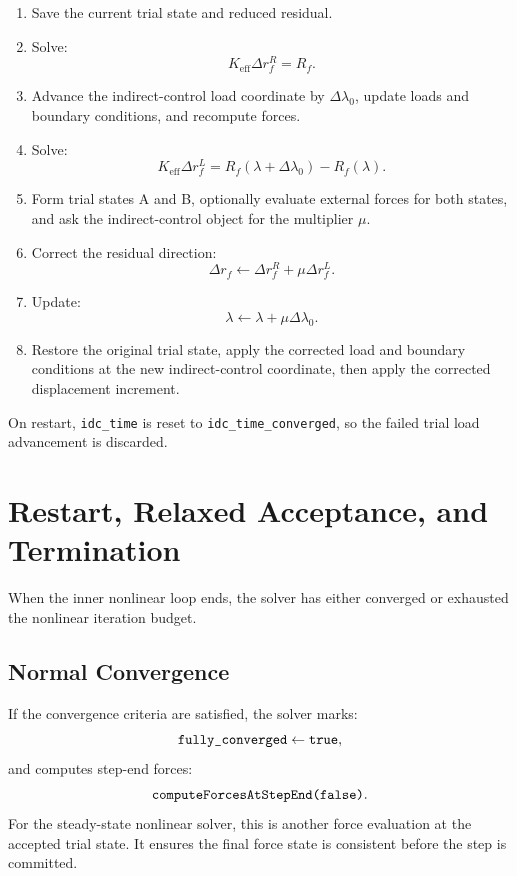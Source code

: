 \documentclass[11pt,a4paper]{article}
\newcommand{\code}[1]{\ifmmode\text{\texttt{\detokenize{#1}}}\else\nolinkurl{#1}\fi}
\begin{document}
\begin{enumerate}[leftmargin=2em]
  \item Save the current trial state and reduced residual.
  \item Solve:
        \[
          K_{\mathrm{eff}} \Delta r_f^R = R_f.
        \]
  \item Advance the indirect-control load coordinate by \(\Delta \lambda_0\),
        update loads and boundary conditions, and recompute forces.
  \item Solve:
        \[
          K_{\mathrm{eff}} \Delta r_f^L
          =
          R_f(\lambda+\Delta\lambda_0) - R_f(\lambda).
        \]
  \item Form trial states A and B, optionally evaluate external forces for
        both states, and ask the indirect-control object for the multiplier
        \(\mu\).
  \item Correct the residual direction:
        \[
          \Delta r_f \leftarrow \Delta r_f^R + \mu \Delta r_f^L.
        \]
  \item Update:
        \[
          \lambda \leftarrow \lambda + \mu \Delta\lambda_0.
        \]
  \item Restore the original trial state, apply the corrected load and boundary
        conditions at the new indirect-control coordinate, then apply the
        corrected displacement increment.
\end{enumerate}

On restart, \code{idc_time} is reset to \code{idc_time_converged}, so the failed
trial load advancement is discarded.

\section{Restart, Relaxed Acceptance, and Termination}

When the inner nonlinear loop ends, the solver has either converged or exhausted
the nonlinear iteration budget.

\subsection{Normal Convergence}

If the convergence criteria are satisfied, the solver marks:
\[
  \code{fully_converged} \leftarrow \code{true},
\]
and computes step-end forces:
\[
  \code{computeForcesAtStepEnd(false)}.
\]
For the steady-state nonlinear solver, this is another force evaluation at the
accepted trial state.  It ensures the final force state is consistent before the
step is committed.
\end{document}
